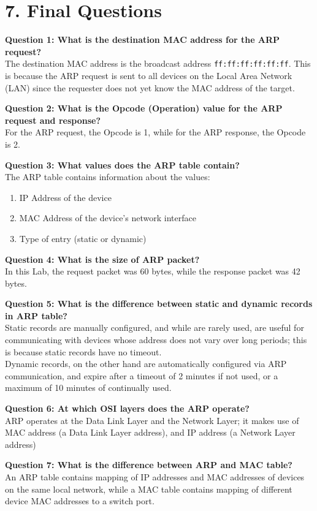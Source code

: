 \documentclass[a4paper,12pt]{article}
\begin{document}
\section*{7. Final Questions}

\textbf{Question 1: What is the destination MAC address for the ARP request?} \\
The destination MAC address is the broadcast address \texttt{ff:ff:ff:ff:ff:ff}. This is because the ARP request is sent to all devices on the Local Area Network (LAN) since the requester does not yet know the MAC address of the target.

\textbf{Question 2: What is the Opcode (Operation) value for the ARP request and response?}\\
For the ARP request, the Opcode is 1, while for the ARP response, the Opcode is 2.

\textbf{Question 3: What values does the ARP table contain?} \\
The ARP table contains information about the values:
\begin{enumerate}
    \item IP Address of the device
    \item MAC Address of the device's network interface
    \item Type of entry (static or dynamic)
\end{enumerate}
\textbf{Question 4: What is the size of ARP packet?}\\
In this Lab, the request packet was 60 bytes, while the response packet was 42 bytes.

\textbf{Question 5: What is the difference between static and dynamic records in ARP table?} \\
Static records are manually configured, and while are rarely used, are useful for communicating with devices whose address does not vary over long periods; this is because static records have no timeout.\\
Dynamic records, on the other hand are automatically configured via ARP communication, and expire after a timeout of 2 minutes if not used, or a maximum of 10 minutes of continually used.

\textbf{Question 6: At which OSI layers does the ARP operate?} \\
ARP operates at the Data Link Layer and the Network Layer; it makes use of MAC address (a Data Link Layer address), and IP address (a Network Layer address)

\textbf{Question 7: What is the difference between ARP and MAC table?} \\
An ARP table contains mapping of IP addresses and MAC addresses of devices on the same local network, while a MAC table contains mapping of different device MAC addresses to a switch port.
\end{document}
